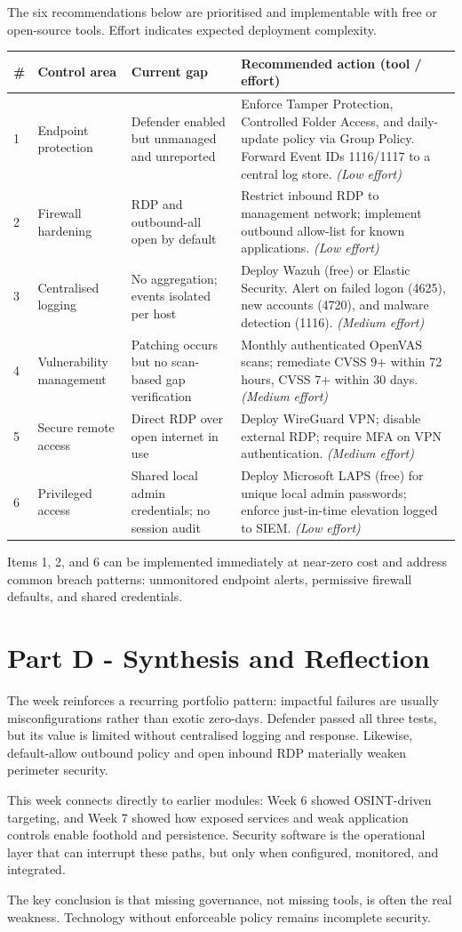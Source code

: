 \documentclass[10pt,a4paper]{article}
\begin{document}
The six recommendations below are prioritised and implementable with free or open-source tools. Effort indicates expected deployment complexity.

\begin{longtable}{p{0.4cm}p{3.2cm}p{4.2cm}p{6.4cm}}
\toprule
\# & Control area & Current gap & Recommended action (tool / effort) \\
\midrule
1 & Endpoint protection & Defender enabled but unmanaged and unreported & Enforce Tamper Protection, Controlled Folder Access, and daily-update policy via Group Policy. Forward Event IDs 1116/1117 to a central log store. \textit{(Low effort)} \\
2 & Firewall hardening & RDP and outbound-all open by default & Restrict inbound RDP to management network; implement outbound allow-list for known applications. \textit{(Low effort)} \\
3 & Centralised logging & No aggregation; events isolated per host & Deploy Wazuh (free) or Elastic Security. Alert on failed logon (4625), new accounts (4720), and malware detection (1116). \textit{(Medium effort)} \\
4 & Vulnerability management & Patching occurs but no scan-based gap verification & Monthly authenticated OpenVAS scans; remediate CVSS 9+ within 72 hours, CVSS 7+ within 30 days. \textit{(Medium effort)} \\
5 & Secure remote access & Direct RDP over open internet in use & Deploy WireGuard VPN; disable external RDP; require MFA on VPN authentication. \textit{(Medium effort)} \\
6 & Privileged access & Shared local admin credentials; no session audit & Deploy Microsoft LAPS (free) for unique local admin passwords; enforce just-in-time elevation logged to SIEM. \textit{(Low effort)} \\
\bottomrule
\end{longtable}

Items 1, 2, and 6 can be implemented immediately at near-zero cost and address common breach patterns: unmonitored endpoint alerts, permissive firewall defaults, and shared credentials.

\section*{Part D - Synthesis and Reflection}
The week reinforces a recurring portfolio pattern: impactful failures are usually misconfigurations rather than exotic zero-days. Defender passed all three tests, but its value is limited without centralised logging and response. Likewise, default-allow outbound policy and open inbound RDP materially weaken perimeter security.

This week connects directly to earlier modules: Week 6 showed OSINT-driven targeting, and Week 7 showed how exposed services and weak application controls enable foothold and persistence. Security software is the operational layer that can interrupt these paths, but only when configured, monitored, and integrated.

The key conclusion is that missing governance, not missing tools, is often the real weakness. Technology without enforceable policy remains incomplete security.
\end{document}
